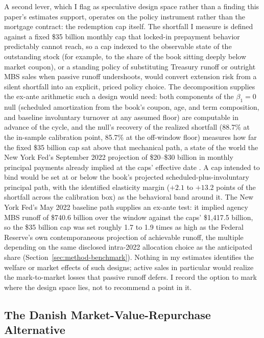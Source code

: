 \documentclass[12pt]{article}
\begin{document}
A second lever, which I flag as speculative design space rather than a finding this paper's estimates support, operates on the policy instrument rather than the mortgage contract: the redemption cap itself. The shortfall I measure is defined against a fixed \$35 billion monthly cap that locked-in prepayment behavior predictably cannot reach, so a cap indexed to the observable state of the outstanding stock (for example, to the share of the book sitting deeply below market coupon), or a standing policy of substituting Treasury runoff or outright MBS sales when passive runoff undershoots, would convert extension risk from a silent shortfall into an explicit, priced policy choice. The decomposition supplies the ex-ante arithmetic such a design would need: both components of the $\beta_1 = 0$ null (scheduled amortization from the book's coupon, age, and term composition, and baseline involuntary turnover at any assumed floor) are computable in advance of the cycle, and the null's recovery of the realized shortfall (88.7\% at the in-sample calibration point, 85.7\% at the off-window floor) measures how far the fixed \$35 billion cap sat above that mechanical path, a state of the world the New York Fed's September 2022 projection of \$20--\$30 billion in monthly principal payments already implied at the caps' effective date \citep{nyfed2022}. A cap intended to bind would be set at or below the book's projected scheduled-plus-involuntary principal path, with the identified elasticity margin ($+2.1$ to $+13.2$ points of the shortfall across the calibration box) as the behavioral band around it. The New York Fed's May 2022 baseline path supplies an ex-ante test: it implied agency MBS runoff of \$740.6 billion over the window against the caps' \$1{,}417.5 billion, so the \$35 billion cap was set roughly 1.7 to 1.9 times as high as the Federal Reserve's own contemporaneous projection of achievable runoff, the multiple depending on the same disclosed intra-2022 allocation choice as the anticipated share (Section~\ref{sec:method-benchmark}). Nothing in my estimates identifies the welfare or market effects of such designs; active sales in particular would realize the mark-to-market losses that passive runoff defers. I record the option to mark where the design space lies, not to recommend a point in it.

\subsection{The Danish Market-Value-Repurchase Alternative}\label{sec:abm-danish}
\end{document}
